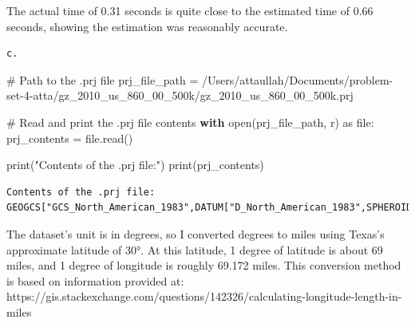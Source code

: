 \documentclass[
  letterpaper,
  DIV=11,
  numbers=noendperiod]{scrartcl}
\newenvironment{Shaded}{\begin{snugshade}}{\end{snugshade}}
\newcommand{\BuiltInTok}[1]{\textcolor[rgb]{0.00,0.23,0.31}{#1}}
\newcommand{\CommentTok}[1]{\textcolor[rgb]{0.37,0.37,0.37}{#1}}
\newcommand{\ControlFlowTok}[1]{\textcolor[rgb]{0.00,0.23,0.31}{\textbf{#1}}}
\newcommand{\ImportTok}[1]{\textcolor[rgb]{0.00,0.46,0.62}{#1}}
\newcommand{\NormalTok}[1]{\textcolor[rgb]{0.00,0.23,0.31}{#1}}
\newcommand{\OperatorTok}[1]{\textcolor[rgb]{0.37,0.37,0.37}{#1}}
\newcommand{\StringTok}[1]{\textcolor[rgb]{0.13,0.47,0.30}{#1}}
\begin{document}
The actual time of 0.31 seconds is quite close to the estimated time of
0.66 seconds, showing the estimation was reasonably accurate.

\begin{verbatim}
c. 
\end{verbatim}

\begin{Shaded}
\begin{Highlighting}[]
\CommentTok{\# Path to the .prj file}
\NormalTok{prj\_file\_path }\OperatorTok{=} \StringTok{\textquotesingle{}/Users/attaullah/Documents/problem{-}set{-}4{-}atta/gz\_2010\_us\_860\_00\_500k/gz\_2010\_us\_860\_00\_500k.prj\textquotesingle{}}

\CommentTok{\# Read and print the .prj file contents}
\ControlFlowTok{with} \BuiltInTok{open}\NormalTok{(prj\_file\_path, }\StringTok{\textquotesingle{}r\textquotesingle{}}\NormalTok{) }\ImportTok{as} \BuiltInTok{file}\NormalTok{:}
\NormalTok{    prj\_contents }\OperatorTok{=} \BuiltInTok{file}\NormalTok{.read()}

\BuiltInTok{print}\NormalTok{(}\StringTok{"Contents of the .prj file:"}\NormalTok{)}
\BuiltInTok{print}\NormalTok{(prj\_contents)}
\end{Highlighting}
\end{Shaded}

\begin{verbatim}
Contents of the .prj file:
GEOGCS["GCS_North_American_1983",DATUM["D_North_American_1983",SPHEROID["GRS_1980",6378137,298.257222101]],PRIMEM["Greenwich",0],UNIT["Degree",0.017453292519943295]]
\end{verbatim}

The dataset's unit is in degrees, so I converted degrees to miles using
Texas's approximate latitude of 30°. At this latitude, 1 degree of
latitude is about 69 miles, and 1 degree of longitude is roughly 69.172
miles. This conversion method is based on information provided at:
https://gis.stackexchange.com/questions/142326/calculating-longitude-length-in-miles
\end{document}
